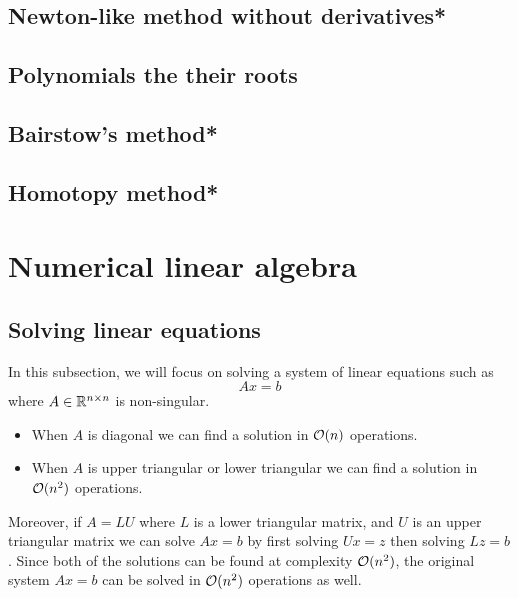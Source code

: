 \documentclass[11pt,a4paper]{article}
\begin{document}
\subsection{Newton-like method without derivatives*}

\subsection{Polynomials the their roots}



\subsection{Bairstow's method*}

\subsection{Homotopy method*}


\newpage

\section{Numerical linear algebra}
\subsection{Solving linear equations}
In this subsection, we will focus on solving a system of linear equations
such as
\[
  Ax = b
\]
where $A \in \mathbb{R}^{n \times n}$ is non-singular.
\begin{itemize}
  \item When $A$ is diagonal we can find a solution in $\mathcal{O}(n)$ operations.
  \item When $A$ is upper triangular or lower triangular we can find a
    solution in $\mathcal{O}(n^2)$ operations.
\end{itemize}
Moreover, if $A = LU$ where $L$ is a lower triangular matrix, and $U$ is
an upper triangular matrix we can solve $Ax = b$ by first solving
$Ux = z$ then solving $Lz = b$.
Since both of the solutions can be found at complexity $\mathcal{O}(n^2)$,
the original system $Ax = b$ can be solved in $\mathcal{O}(n^2)$ operations as well.
\end{document}

